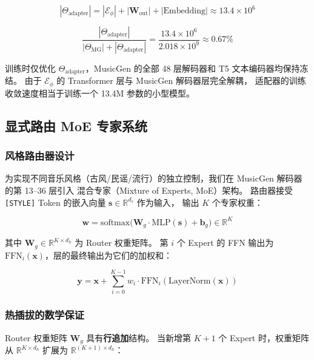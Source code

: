 \documentclass[UTF8,12pt,a4paper]{ctexart}
\begin{document}
\begin{equation}
|\Theta_{\text{adapter}}| = |\mathcal{E}_{\phi}| + |\mathbf{W}_{\text{out}}| + |\text{Embedding}|
\approx 13.4\times 10^6
\end{equation}

\begin{equation}
\frac{|\Theta_{\text{adapter}}|}{|\Theta_{\text{MG}}| + |\Theta_{\text{adapter}}|}
= \frac{13.4\times 10^6}{2.018\times 10^9} \approx 0.67\%
\end{equation}

训练时仅优化 $\Theta_{\text{adapter}}$，MusicGen 的全部 48 层解码器和 T5 文本编码器均保持冻结。
由于 $\mathcal{E}_{\phi}$ 的 Transformer 层与 MusicGen 解码器层完全解耦，
适配器的训练收敛速度相当于训练一个 13.4M 参数的小型模型。

\subsection{显式路由 MoE 专家系统}

\subsubsection{风格路由器设计}

为实现不同音乐风格（古风/民谣/流行）的独立控制，我们在 MusicGen 解码器的第 13--36 层引入
混合专家（Mixture of Experts, MoE）架构。
路由器接受 \texttt{[STYLE]} Token 的嵌入向量 $\mathbf{s} \in \mathbb{R}^{d_s}$ 作为输入，
输出 $K$ 个专家权重：

\begin{equation}
\mathbf{w} = \text{softmax}\big(\mathbf{W}_g \cdot \text{MLP}(\mathbf{s}) + \mathbf{b}_g\big) \in \mathbb{R}^{K}
\end{equation}

其中 $\mathbf{W}_g \in \mathbb{R}^{K \times d_h}$ 为 Router 权重矩阵。
第 $i$ 个 Expert 的 FFN 输出为 $\text{FFN}_i(\mathbf{x})$，层的最终输出为它们的加权和：

\begin{equation}
\mathbf{y} = \mathbf{x} + \sum_{i=0}^{K-1} w_i \cdot \text{FFN}_i(\text{LayerNorm}(\mathbf{x}))
\end{equation}

\subsubsection{热插拔的数学保证}

Router 权重矩阵 $\mathbf{W}_g$ 具有\textbf{行追加}结构。
当新增第 $K+1$ 个 Expert 时，权重矩阵从 $\mathbb{R}^{K \times d_h}$ 扩展为 $\mathbb{R}^{(K+1) \times d_h}$：
\end{document}
